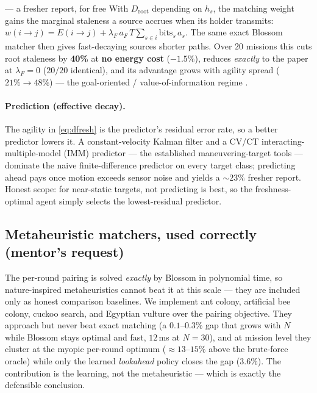 \begin{ideabox}{ --- a fresher report, for free}
With $D_{\mathrm{root}}$ depending on $h_s$, the matching weight gains the
marginal staleness a source accrues when its holder transmits:
$w(i\!\to\!j)=E(i\!\to\!j)+\lambda_F\,a_F\,T\!\sum_{s\in i}\text{bits}_s\,a_s$.
The same exact Blossom matcher then gives fast-decaying sources shorter paths.
Over $20$ missions this cuts root staleness by \textbf{40\%} at \textbf{no energy
cost} ($-1.5\%$), reduces \emph{exactly} to the paper at $\lambda_F{=}0$
($20/20$ identical), and its advantage grows with agility spread
($21\%\!\to\!48\%$) --- the goal-oriented / value-of-information regime
\cite{goaloriented2025}.
\end{ideabox}

\paragraph{Prediction (effective decay).} The agility in \eqref{eq:dfresh} is the
predictor's residual error rate, so a better predictor lowers it. A
constant-velocity Kalman filter and a CV/CT interacting-multiple-model (IMM)
predictor --- the established maneuvering-target tools --- dominate the naive
finite-difference predictor on every target class; predicting ahead pays once
motion exceeds sensor noise and yields a ${\sim}23\%$ fresher report. Honest
scope: for near-static targets, not predicting is best, so the freshness-optimal
agent simply selects the lowest-residual predictor.

\subsection{Metaheuristic matchers, used correctly (mentor's request)}

The per-round pairing is solved \emph{exactly} by Blossom in polynomial time, so
nature-inspired metaheuristics cannot beat it at this scale --- they are included
only as honest comparison baselines. We implement ant colony, artificial bee
colony, cuckoo search, and Egyptian vulture over the pairing objective. They
approach but never beat exact matching (a $0.1$--$0.3\%$ gap that grows with $N$
while Blossom stays optimal and fast, $12$\,ms at $N{=}30$), and at mission level
they cluster at the myopic per-round optimum ($\approx 13$--$15\%$ above the
brute-force oracle) while only the learned \emph{lookahead} policy closes the gap
($3.6\%$). The contribution is the learning, not the metaheuristic --- which is
exactly the defensible conclusion.

